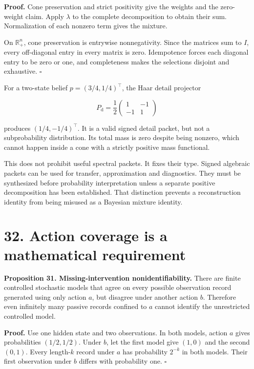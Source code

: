 \documentclass[11pt,letterpaper]{article}
\begin{document}
\textbf{Proof.} Cone preservation and strict positivity give the weights
and the zero-weight claim. Apply \(\lambda\) to the complete
decomposition to obtain their sum. Normalization of each nonzero term
gives the mixture.

On \(\mathbb R^n_+\), cone preservation is entrywise nonnegativity.
Since the matrices sum to \(I\), every off-diagonal entry in every
matrix is zero. Idempotence forces each diagonal entry to be zero or
one, and completeness makes the selections disjoint and exhaustive.
\(\square\)

For a two-state belief \(p=(3/4,1/4)^\top\), the Haar detail projector

\[
P_{\mathrm d}=\frac12\begin{pmatrix}1&-1\\-1&1\end{pmatrix}
\]

produces \((1/4,-1/4)^\top\). It is a valid signed detail packet, but
not a subprobability distribution. Its total mass is zero despite being
nonzero, which cannot happen inside a cone with a strictly positive mass
functional.

This does not prohibit useful spectral packets. It fixes their type.
Signed algebraic packets can be used for transfer, approximation and
diagnostics. They must be synthesized before probability interpretation
unless a separate positive decomposition has been established. That
distinction prevents a reconstruction identity from being misused as a
Bayesian mixture identity.

\section{32. Action coverage is a mathematical
requirement}\label{action-coverage-is-a-mathematical-requirement}

\textbf{Proposition 31. Missing-intervention nonidentifiability.} There
are finite controlled stochastic models that agree on every possible
observation record generated using only action \(a\), but disagree under
another action \(b\). Therefore even infinitely many passive records
confined to \(a\) cannot identify the unrestricted controlled model.

\textbf{Proof.} Use one hidden state and two observations. In both
models, action \(a\) gives probabilities \((1/2,1/2)\). Under \(b\), let
the first model give \((1,0)\) and the second \((0,1)\). Every
length-\(k\) record under \(a\) has probability \(2^{-k}\) in both
models. Their first observation under \(b\) differs with probability
one. \(\square\)
\end{document}

